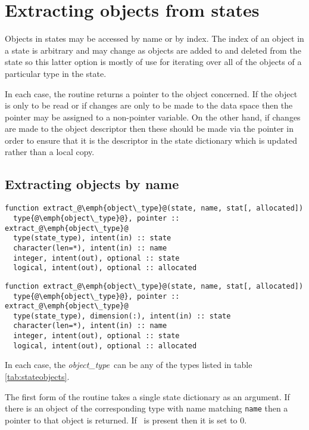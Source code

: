 \documentclass[a4paper, 11pt]{book}
\begin{document}
\section{Extracting objects from states}

Objects in states may be accessed by name or by index. The index of an
object in a state is arbitrary and may change as objects are added to and
deleted from the state so this latter option is mostly of use for iterating
over all of the objects of a particular type in the state. 

In each case, the routine returns a pointer to the object concerned. If the
object is only to be read or if changes are only to be made to the data
space then the pointer may be assigned to a non-pointer variable. On the
other hand, if changes are made to the object descriptor then these should be
made via the pointer in order to ensure that it is the descriptor in the
state dictionary which is updated rather than a local copy.

\subsection{Extracting objects by name}
  
\begin{lstlisting}
function extract_@\emph{object\_type}@(state, name, stat[, allocated])
  type{@\emph{object\_type}@}, pointer :: extract_@\emph{object\_type}@ 
  type(state_type), intent(in) :: state
  character(len=*), intent(in) :: name
  integer, intent(out), optional :: state
  logical, intent(out), optional :: allocated
\end{lstlisting}

\begin{lstlisting}
function extract_@\emph{object\_type}@(state, name, stat[, allocated])
  type{@\emph{object\_type}@}, pointer :: extract_@\emph{object\_type}@ 
  type(state_type), dimension(:), intent(in) :: state
  character(len=*), intent(in) :: name
  integer, intent(out), optional :: state
  logical, intent(out), optional :: allocated
\end{lstlisting}

In each case, the \emph{object\_type}\ can be any of the types listed in
table \ref{tab:stateobjects}. 

The first form of the routine takes a single state dictionary as an
argument. If there is an object of the corresponding type with name matching
\lstinline+name+ then a pointer to that object is returned. If
\stat\ is present then it is set to 0.
\end{document}
